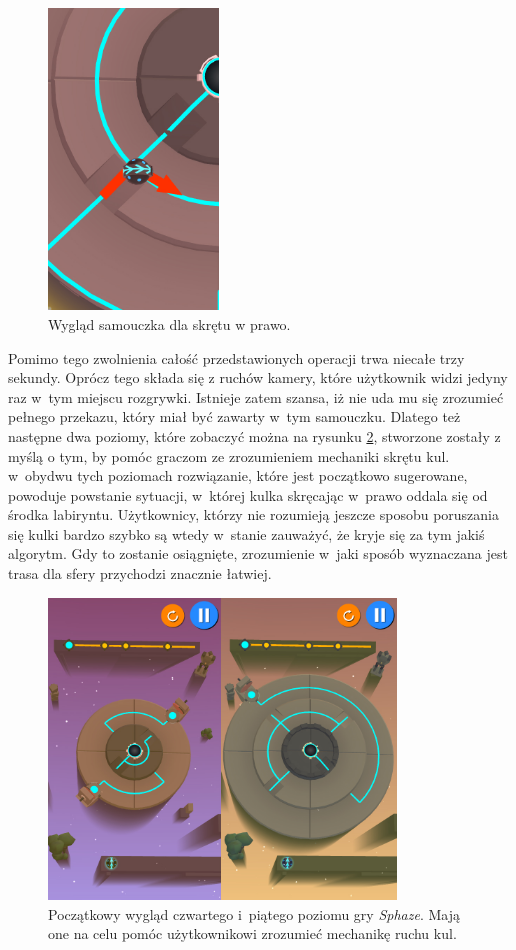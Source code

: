 \documentclass[a4paper,12pt,numbers=noenddot]{report}
\begin{document}
\begin{figure}[h!]
	\centering
  	\includegraphics[height=8cm]{fig/l3_closeup.jpg}
	\caption{Wygląd samouczka dla skrętu w prawo.}
	\label{fig:tut_L3_2}
\end{figure}

Pomimo tego zwolnienia całość przedstawionych operacji trwa niecałe trzy sekundy. Oprócz tego składa się z ruchów kamery, które użytkownik widzi jedyny raz w~tym miejscu rozgrywki. Istnieje zatem szansa, iż nie uda mu się zrozumieć pełnego przekazu, który miał być zawarty w~tym samouczku. Dlatego też następne dwa poziomy, które zobaczyć można na rysunku \ref{fig:tut_L3_3}, stworzone zostały z myślą o tym, by pomóc graczom ze zrozumieniem mechaniki skrętu kul. w~obydwu tych poziomach rozwiązanie, które jest początkowo sugerowane, powoduje powstanie sytuacji, w~której kulka skręcając w~prawo oddala się od środka labiryntu. Użytkownicy, którzy nie rozumieją jeszcze sposobu poruszania się kulki bardzo szybko są wtedy w~stanie zauważyć, że kryje się za tym jakiś algorytm. Gdy to zostanie osiągnięte, zrozumienie w~jaki sposób wyznaczana jest trasa dla sfery przychodzi znacznie łatwiej.

\begin{figure}[h!]
	\centering
  	\includegraphics[height=8cm]{fig/l4_l5.jpg}
	\caption{Początkowy wygląd czwartego i~piątego poziomu gry \textit{Sphaze}. Mają one na celu pomóc użytkownikowi zrozumieć mechanikę ruchu kul.}
	\label{fig:tut_L3_3}
\end{figure}
\end{document}
